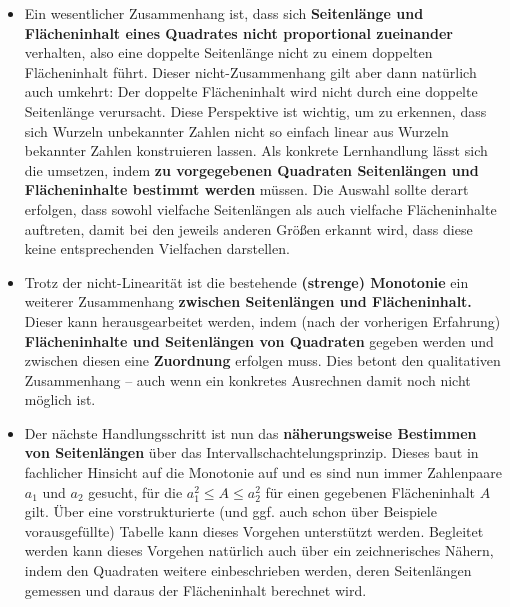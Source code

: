 \documentclass[
]{scrbook}
\theoremstyle{definition}
\theoremstyle{definition}
\theoremstyle{definition}
\theoremstyle{definition}
\theoremstyle{remark}
\begin{document}
\begin{enumerate}
  \begin{itemize}
  \item
    Ein wesentlicher Zusammenhang ist, dass sich \textbf{Seitenlänge und Flächeninhalt eines Quadrates nicht proportional zueinander} verhalten, also eine doppelte Seitenlänge nicht zu einem doppelten Flächeninhalt führt. Dieser nicht-Zusammenhang gilt aber dann natürlich auch umkehrt: Der doppelte Flächeninhalt wird nicht durch eine doppelte Seitenlänge verursacht. Diese Perspektive ist wichtig, um zu erkennen, dass sich Wurzeln unbekannter Zahlen nicht so einfach linear aus Wurzeln bekannter Zahlen konstruieren lassen. Als konkrete Lernhandlung lässt sich die umsetzen, indem \textbf{zu vorgegebenen Quadraten Seitenlängen und Flächeninhalte bestimmt werden} müssen. Die Auswahl sollte derart erfolgen, dass sowohl vielfache Seitenlängen als auch vielfache Flächeninhalte auftreten, damit bei den jeweils anderen Größen erkannt wird, dass diese keine entsprechenden Vielfachen darstellen.
  \item
    Trotz der nicht-Linearität ist die bestehende \textbf{(strenge) Monotonie} ein weiterer Zusammenhang \textbf{zwischen Seitenlängen und Flächeninhalt.} Dieser kann herausgearbeitet werden, indem (nach der vorherigen Erfahrung) \textbf{Flächeninhalte und Seitenlängen von Quadraten} gegeben werden und zwischen diesen eine \textbf{Zuordnung} erfolgen muss. Dies betont den qualitativen Zusammenhang -- auch wenn ein konkretes Ausrechnen damit noch nicht möglich ist.
  \item
    Der nächste Handlungsschritt ist nun das \textbf{näherungsweise Bestimmen von Seitenlängen} über das Intervallschachtelungsprinzip. Dieses baut in fachlicher Hinsicht auf die Monotonie auf und es sind nun immer Zahlenpaare \(a_1\) und \(a_2\) gesucht, für die \(a_1^2 \leq A \leq a_2^2\) für einen gegebenen Flächeninhalt \(A\) gilt. Über eine vorstrukturierte (und ggf. auch schon über Beispiele vorausgefüllte) Tabelle kann dieses Vorgehen unterstützt werden. Begleitet werden kann dieses Vorgehen natürlich auch über ein zeichnerisches Nähern, indem den Quadraten weitere einbeschrieben werden, deren Seitenlängen gemessen und daraus der Flächeninhalt berechnet wird.
  \end{itemize}


\end{enumerate}
\end{document}
